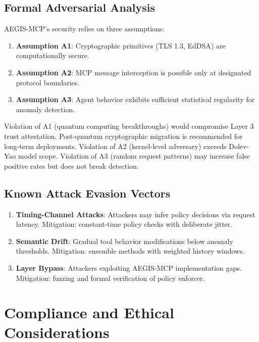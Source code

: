 \documentclass[12pt,twocolumn,journal]{IEEEtran}
\begin{document}
\subsection{Formal Adversarial Analysis}

AEGIS-MCP's security relies on three assumptions:

\begin{enumerate}
\item \textbf{Assumption A1}: Cryptographic primitives (TLS 1.3, EdDSA) are computationally secure.
\item \textbf{Assumption A2}: MCP message interception is possible only at designated protocol boundaries.
\item \textbf{Assumption A3}: Agent behavior exhibits sufficient statistical regularity for anomaly detection.
\end{enumerate}

Violation of A1 (quantum computing breakthroughs) would compromise Layer 3 trust attestation. Post-quantum cryptographic migration is recommended for long-term deployments. Violation of A2 (kernel-level adversary) exceeds Dolev-Yao model scope. Violation of A3 (random request patterns) may increase false positive rates but does not break detection.

\subsection{Known Attack Evasion Vectors}

\begin{enumerate}
\item \textbf{Timing-Channel Attacks}: Attackers may infer policy decisions via request latency. Mitigation: constant-time policy checks with deliberate jitter.

\item \textbf{Semantic Drift}: Gradual tool behavior modifications below anomaly thresholds. Mitigation: ensemble methods with weighted history windows.

\item \textbf{Layer Bypass}: Attackers exploiting AEGIS-MCP implementation gaps. Mitigation: fuzzing and formal verification of policy enforcer.
\end{enumerate}

\section{Compliance and Ethical Considerations}
\label{sec:compliance}
\end{document}
